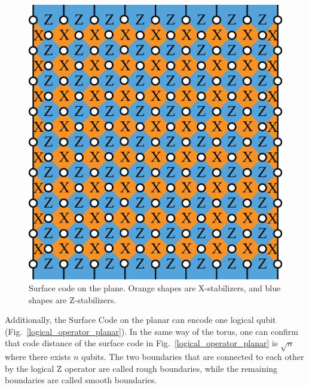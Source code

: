 \documentclass[a4paper,11pt]{ltjsarticle}
\begin{document}
{{        \begin{figure}[h]
            \centering
            \includegraphics[scale=0.30]{figure/planar.eps}
            \vspace{0pt}\caption{Surface code on the plane. Orange shapes are X-stabilizers, and blue shapes are Z-stabilizers.}
            \label{planar}
        \end{figure}

        Additionally, the Surface Code on the planar can encode one logical qubit (Fig.~\ref{logical_operator_planar}). In the same way of the torus, one can confirm that code distance of the surface code in Fig.~\ref{logical_operator_planar} is $\sqrt{n}$ where there exists $n$ qubits. The two boundaries that are connected to each other by the logical Z operator are called rough boundaries, while the remaining boundaries are called smooth boundaries.

}}
\end{document}
